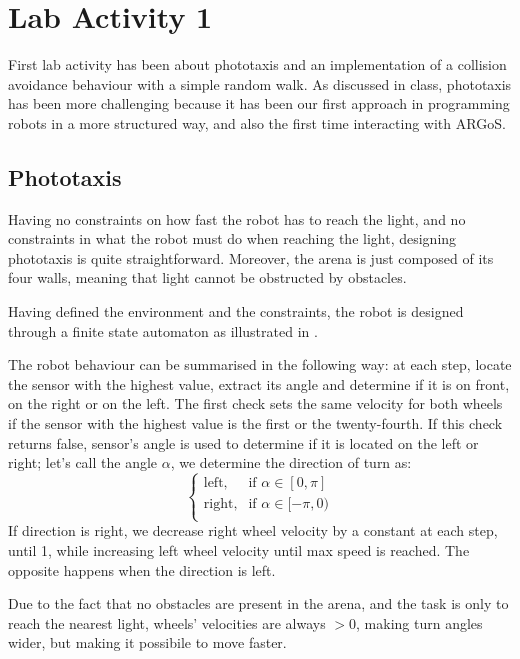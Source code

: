 \section{Lab Activity 1}

First lab activity has been about phototaxis and an implementation of a
collision avoidance behaviour with a simple random walk.
As discussed in class, phototaxis has been more challenging because
it has been our first approach in programming robots in a more structured
way, and also the first time interacting with ARGoS.

\subsection{Phototaxis}\label{ssec:phototaxis}

Having no constraints on how fast the robot has to reach the light, and
no constraints in what the robot must do when reaching the light, designing
phototaxis is quite straightforward. Moreover, the arena is just composed
of its four walls, meaning that light cannot be obstructed by obstacles.

Having defined the environment and the constraints, the robot is designed through
a finite state automaton as illustrated in .

The robot behaviour can be summarised in the following way: at each step,
locate the sensor with the highest value, extract its angle and determine if it
is on front, on the right or on the left. The first check sets the same
velocity for both wheels if the sensor with the highest value is the first or
the twenty-fourth. If this check returns false, sensor's angle is used to
determine if it is located on the left or right; let's call the angle $\alpha$,
we determine the direction of turn as:
%
\begin{equation}
    \begin{cases}
        \text{left}, & \text{if } \alpha \in [0, \pi] \\
        \text{right}, & \text{if } \alpha \in [-\pi, 0) \\
    \end{cases}
\end{equation}
%
If direction is right, we decrease right wheel velocity by a constant at each
step, until 1, while increasing left wheel velocity until max speed is reached.
The opposite happens when the direction is left.

Due to the fact that no obstacles are present in the arena, and the task is
only to reach the nearest light, wheels' velocities are always $> 0$, making
turn angles wider, but making it possibile to move faster.

